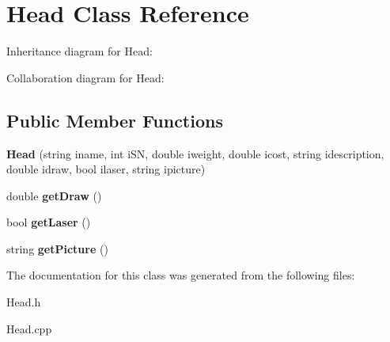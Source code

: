 \hypertarget{classHead}{}\section{Head Class Reference}
\label{classHead}


Inheritance diagram for Head\+:


Collaboration diagram for Head\+:
\subsection*{Public Member Functions}
\begin{DoxyCompactItemize}
\item 
{\bfseries Head} (string iname, int i\+SN, double iweight, double icost, string idescription, double idraw, bool ilaser, string ipicture)\hypertarget{classHead_afcfdc7cca4db48ab3c43bbad1841e529}{}\label{classHead_afcfdc7cca4db48ab3c43bbad1841e529}

\item 
double {\bfseries get\+Draw} ()\hypertarget{classHead_af9f82fb9aa0437a19cfef4f77b118cde}{}\label{classHead_af9f82fb9aa0437a19cfef4f77b118cde}

\item 
bool {\bfseries get\+Laser} ()\hypertarget{classHead_a6f3094d049b3c880317789d3dcd60171}{}\label{classHead_a6f3094d049b3c880317789d3dcd60171}

\item 
string {\bfseries get\+Picture} ()\hypertarget{classHead_a363d69484fce296182504762ee67252e}{}\label{classHead_a363d69484fce296182504762ee67252e}

\end{DoxyCompactItemize}


The documentation for this class was generated from the following files\+:\begin{DoxyCompactItemize}
\item 
Head.\+h\item 
Head.\+cpp\end{DoxyCompactItemize}
